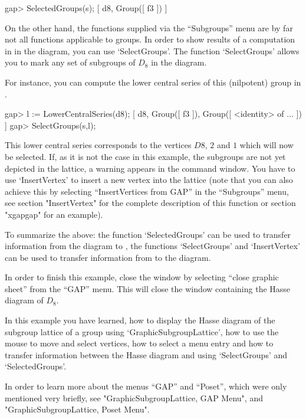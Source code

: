\label{gapxgap}
\begintt
gap> SelectedGroups(s);
[ d8, Group([ f3 ]) ]
\endtt

On the other hand, the functions supplied via the ``Subgroups'' menu are by
far not all functions applicable to groups.  In order to show results of a
computation in {\GAP} in the diagram, you can use `SelectGroups'.  The
function `SelectGroups' allows you to mark any set of subgroups of $D_8$ in
the diagram.

For instance,  you can compute the lower central series of this (nilpotent)
group in {\GAP}.

\begintt
gap> l := LowerCentralSeries(d8);
[ d8, Group([ f3 ]), Group([ <identity> of ... ]) ]
gap> SelectGroups(s,l);
\endtt

This lower central series corresponds to the vertices $D8$, $2$ and
$1$ which will now be selected.  If, as it is not the case in this
example, the subgroups are not yet depicted in the lattice, a warning
appears in the {\GAP} command window. You have to use `InsertVertex'
to insert a new vertex into the lattice (note that you can also
achieve this by selecting ``InsertVertices from GAP'' in the
``Subgroups'' menu, see section "InsertVertex" for the complete
description of this function or section "xgapgap" for an example).

To  summarize the above: the  function `SelectedGroups' can be used to
transfer information  from   the  diagram  to  {\GAP}, the   functions
`SelectGroups' and `InsertVertex' can  be used to transfer information
from {\GAP} to the diagram.

In order to finish this example, close the window by selecting ``close
graphic sheet'' from the ``GAP'' menu.  This will close the window
containing the Hasse diagram of $D_8$.

In this example you have learned, how to display the Hasse diagram of the
subgroup lattice of a group using `GraphicSubgroupLattice', how to use the
mouse to move and select vertices, how to select a menu entry and how to
transfer information between the Hasse diagram and {\GAP} using `SelectGroups'
and `SelectedGroups'.

In order to learn more about the menus ``GAP'' and ``Poset'', which were only
mentioned very briefly, see "GraphicSubgroupLattice, GAP Menu", and
"GraphicSubgroupLattice, Poset Menu".  


